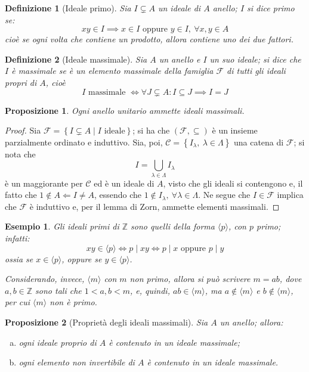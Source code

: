 \documentclass[12pt]{scrartcl}
\theoremstyle{style}
\newtheorem{esempio}{Esempio}[section]
\newtheorem{definizione}{Definizione}[section]
\newtheorem{prop}{Proposizione}[section]
\numberwithin{equation}{subsection}
\begin{document}
\begin{definizione}
	[Ideale primo]
	Sia $I \subsetneq A$ un ideale di $A$ anello; $I$ si dice \textit{primo} se:
	\[
	xy \in I \implies x \in I \text{ oppure } y\in I, \ \forall x,y \in A
	\] 
	cio\`e se ogni volta che contiene un prodotto, allora contiene uno dei due fattori.
\end{definizione}
\begin{definizione}
	[Ideale massimale]
	Sia $A$ un anello e $I$ un suo ideale; si dice che $I$ \`e \textit{massimale} se \`e un elemento massimale della famiglia $\mathcal{F} $ di tutti gli ideali propri di $A$, cio\`e
	\[
	I \text{ massimale }\iff\forall J\subsetneq A : I \subseteq J \implies I = J
	\] 
\end{definizione}
\begin{prop}
	Ogni anello unitario ammette ideali massimali.
\end{prop}
	\begin{proof}
		Sia $\mathcal{F} = \left\{ I \subsetneq A  \mid I \text{ ideale} \right\}  $; si ha che $(\mathcal{F} ,\subseteq)$ \`e un insieme parzialmente ordinato e induttivo.
		Sia, poi, $\mathcal{C} = \left\{ I_\lambda , \ \lambda \in \Lambda  \right\} $ una catena di $\mathcal{F} $; si nota che
		\[
		I = \bigcup_{\lambda \in \Lambda } I_\lambda 
		\] 
		\`e un maggiorante per $\mathcal{C} $ ed \`e un ideale di $A$, visto che gli ideali si contengono e, il fatto che $1 \not\in A\Leftarrow I\neq A$, essendo che $1\not \in I_\lambda , \ \forall \lambda \in \Lambda $.
		Ne segue che $I \in \mathcal{F} $ implica che $\mathcal{F} $ \`e induttivo e, per il lemma di Zorn, ammette elementi massimali.
	\end{proof}
\begin{esempio}
Gli ideali primi di $\mathbb{Z}$ sono quelli della forma $\langle p \rangle$, con $p$ primo; infatti:
\[
xy \in \langle p \rangle \iff p  \mid xy \iff p \mid x \text{ oppure }p  \mid y
\] 
ossia se $x \in \langle p \rangle$, oppure se $y \in \langle p \rangle$.

Considerando, invece, $\langle m \rangle$ con $m$ non primo, allora si pu\`o scrivere $m = ab$, dove $a,b \in \mathbb{Z}$ sono tali che $1<a,b<m$, e, quindi, $ab \in \langle m \rangle$, ma $a \not \in \langle m \rangle$ e $b \not \in \langle m \rangle$, per cui $\langle m \rangle$ non \`e primo.
\end{esempio}
\begin{prop}
	[Propriet\`a degli ideali massimali]
	Sia $A$ un anello; allora:
	\begin{enumerate}[(a).]
		\item ogni ideale proprio di $A$ \`e contenuto in un ideale massimale;
		\item ogni elemento non invertibile di $A$ \`e contenuto in un ideale massimale.
	\end{enumerate}
\end{prop}
\end{document}
